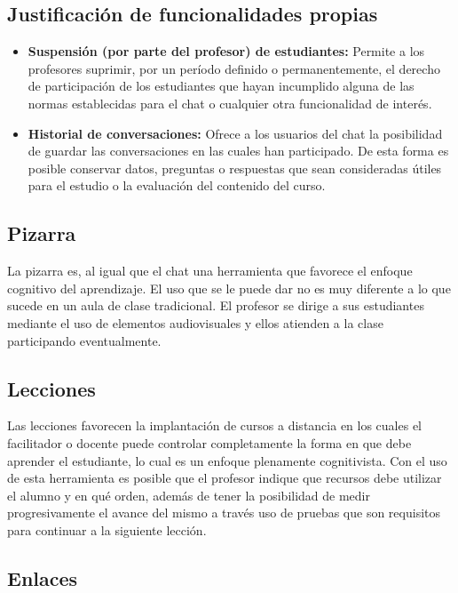 \subsection*{Justificación de funcionalidades propias}

\begin{itemize}

\item \textbf{Suspensión (por parte del profesor) de estudiantes:} Permite a los profesores suprimir, por un período definido o permanentemente, el derecho de participación de los estudiantes que hayan incumplido alguna de las normas establecidas para el chat o cualquier otra funcionalidad de interés.

\item \textbf{Historial de conversaciones:} Ofrece a los usuarios del chat la posibilidad de guardar las conversaciones en las cuales han participado. De esta forma es posible conservar datos, preguntas o respuestas que sean consideradas útiles para el estudio o la evaluación del contenido del curso.

\end{itemize}

\subsection{Pizarra}
La pizarra es, al igual que el chat una herramienta que favorece el enfoque cognitivo del aprendizaje. El uso que se le puede dar no es muy diferente a lo que sucede en un aula de clase tradicional. El profesor se dirige a sus estudiantes mediante el uso de elementos audiovisuales y ellos atienden a la clase participando eventualmente.

\subsection{Lecciones}

Las lecciones favorecen la implantación de cursos a distancia en los cuales el facilitador o docente puede controlar completamente la forma en que debe aprender el estudiante, lo cual es un enfoque plenamente cognitivista. Con el uso de esta herramienta es posible que el profesor indique que recursos debe utilizar el alumno y en qué orden, además de tener la posibilidad de medir progresivamente el avance del mismo a través uso de pruebas que son requisitos para continuar a la siguiente lección.

\subsection{Enlaces}

